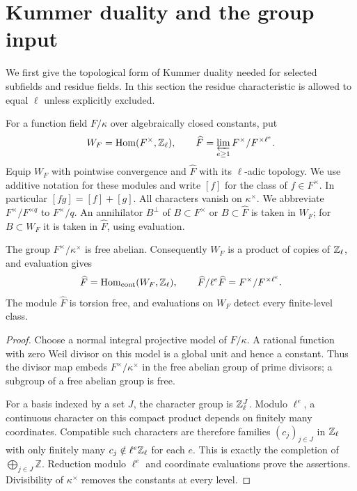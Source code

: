 \section{Kummer duality and the group input}\label{sec:preliminaries}

We first give the topological form of Kummer duality needed for selected
subfields and residue fields.  In this section the residue characteristic
is allowed to equal $\ell$ unless explicitly excluded.

For a function field $F/\kappa$ over algebraically closed constants, put
\[
 W_F=\operatorname{Hom}(F^\times,\mathbb Z_\ell),\qquad
 \widehat F=\varprojlim_{e\ge1} F^\times/F^{\times\ell^e}.
\]
Equip $W_F$ with pointwise convergence and $\widehat F$ with its
$\ell$-adic topology.  We use additive notation for these modules and
write $[f]$ for the class of $f\in F^\times$.  In particular
$[fg]=[f]+[g]$.  All characters vanish on $\kappa^\times$.  We abbreviate
$F^\times/F^{\times q}$ to $F^\times/q$.  An annihilator $B^\perp$
of $B\subset F^\times$ or $B\subset\widehat F$ is taken in $W_F$;
for $B\subset W_F$ it is taken in $\widehat F$, using evaluation.

\begin{lemma}\label{prelim:duality}
The group $F^\times/\kappa^\times$ is free abelian.  Consequently
$W_F$ is a product of copies of $\mathbb Z_\ell$, and evaluation gives
\[
 \widehat F=\operatorname{Hom}_{\mathrm{cont}}(W_F,\mathbb Z_\ell),\qquad
 \widehat F/\ell^e\widehat F=F^\times/F^{\times\ell^e}.
\]
The module $\widehat F$ is torsion free, and evaluations on $W_F$
detect every finite-level class.
\end{lemma}
\begin{proof}
Choose a normal integral projective model of $F/\kappa$.  A rational
function with zero Weil divisor on this model is a global unit and hence
a constant.  Thus the divisor map embeds $F^\times/\kappa^\times$ in
the free abelian group of prime divisors; a subgroup of a free abelian
group is free.

For a basis indexed by a set $J$, the character group is $\mathbb Z_\ell^J$.
Modulo $\ell^e$, a continuous character on this compact product depends
on finitely many coordinates.  Compatible such characters are therefore
families $(c_j)_{j\in J}$ in $\mathbb Z_\ell$ with only finitely many
$c_j\notin\ell^e\mathbb Z_\ell$ for each $e$.  This is exactly the completion
of $\bigoplus_{j\in J}\mathbb Z$.  Reduction modulo $\ell^e$ and
coordinate evaluations prove the assertions.  Divisibility of
$\kappa^\times$ removes the constants at every level.
\end{proof}

